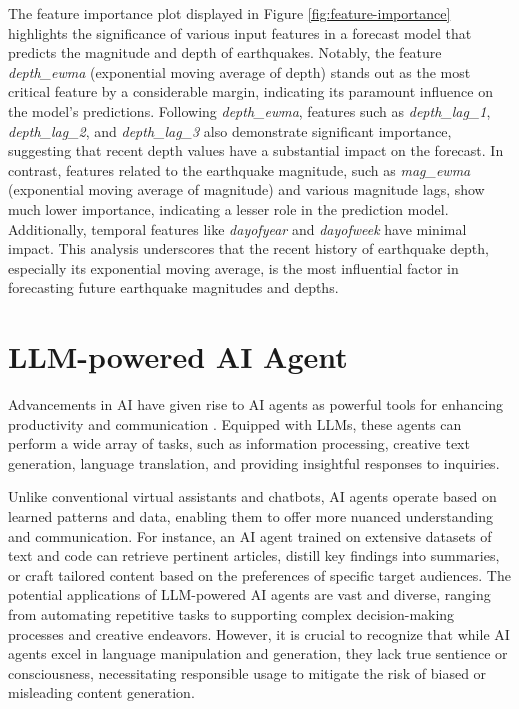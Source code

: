 The feature importance plot displayed in Figure \ref{fig:feature-importance}
highlights the significance of various input features in a forecast model that
predicts the magnitude and depth of earthquakes. Notably, the feature
\textit{depth\_ewma} (exponential moving average of depth) stands out as
the most critical feature by a considerable margin, indicating its paramount
influence on the model's predictions. Following \textit{depth\_ewma},
features such as \textit{depth\_lag\_1}, \textit{depth\_lag\_2}, and
\textit{depth\_lag\_3} also demonstrate significant importance, suggesting
that recent depth values have a substantial impact on the forecast. In
contrast, features related to the earthquake magnitude, such as
\textit{mag\_ewma} (exponential moving average of magnitude) and various
magnitude lags, show much lower importance, indicating a lesser role in
the prediction model. Additionally, temporal features like \textit{dayofyear}
and \textit{dayofweek} have minimal impact. This analysis underscores that
the recent history of earthquake depth, especially its exponential moving
average, is the most influential factor in forecasting future earthquake
magnitudes and depths.

\section{LLM-powered AI Agent}
Advancements in AI have given rise to AI agents as powerful tools
for enhancing productivity and communication \parencite{xi2023rise}.
Equipped with \ac{LLM}s, these agents can perform a wide array of tasks,
such as information processing, creative text generation, language
translation, and providing insightful responses to inquiries.

Unlike conventional virtual assistants and chatbots, AI agents operate
based on learned patterns and data, enabling them to offer more nuanced
understanding and communication. For instance, an AI agent trained on
extensive datasets of text and code can retrieve pertinent articles,
distill key findings into summaries, or craft tailored content based
on the preferences of specific target audiences. The potential
applications of LLM-powered AI agents are vast and diverse, ranging
from automating repetitive tasks to supporting complex decision-making
processes and creative endeavors. However, it is crucial to recognize
that while AI agents excel in language manipulation and generation, they
lack true sentience or consciousness, necessitating responsible usage to
mitigate the risk of biased or misleading content generation.

